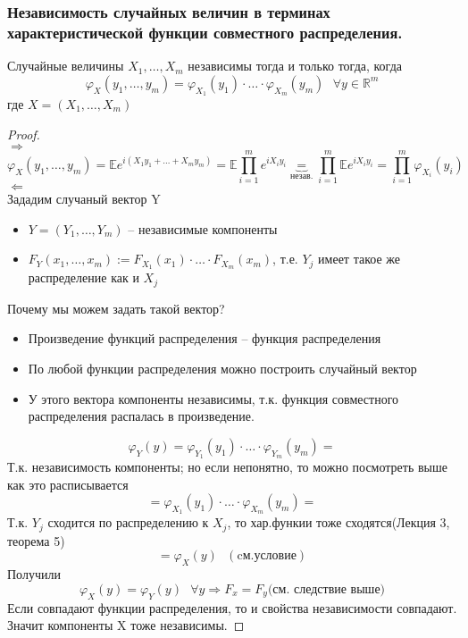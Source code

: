 	\subsubsection{Независимость случайных величин в терминах характеристической функции совместного распределения.}
	\begin{theorem}
		Случайные величины $ X_1,\ldots, X_m $ независимы тогда и только тогда, когда 
		$$\varphi_X(y_1,\ldots, y_m) = \varphi_{X_1}(y_1)\cdot\ldots\cdot\varphi_{X_m}(y_m)\text{ }\forall y\in\mathbb{R}^m$$
		где $X = (X_1, \ldots, X_m)$
	\end{theorem}
	\begin{proof}
		\text{ }\\
		$\Rightarrow$\\
		$$\varphi_X(y_1,\ldots,y_m) = \mathbb{E}e^{i(X_1y_1 + \ldots + X_my_m)} = \mathbb{E}\prod_{i = 1}^{m}e^{iX_iy_i} \underbrace{=}_{\text{незав.}} \prod_{i = 1}^m\mathbb{E}e^{iX_iy_i} = \prod_{i = 1}^m\varphi_{X_i}(y_i)$$
		$\Leftarrow$\\
		Зададим случаный вектор Y
		\begin{itemize}
			\item 
			$Y = (Y_1,\ldots, Y_m)$ -- независимые компоненты
			
			\item 
			$F_Y(x_1,\ldots, x_m):= F_{X_1}(x_1)\cdot\ldots\cdot F_{X_m}(x_m)$, т.е. $ Y_j $ имеет такое же распределение как и $ X_j $
		\end{itemize}
		Почему мы можем задать такой вектор?
		\begin{itemize}
			\item Произведение функций распределения -- функция распределения
			\item По любой функции распределения можно построить случайный вектор
			\item У этого вектора компоненты независимы, т.к. функция совместного распределения распалась в произведение. 
		\end{itemize}
		$$\varphi_Y(y) = \varphi_{Y_1}(y_1)\cdot\ldots\cdot\varphi_{Y_m}(y_m) = $$
		Т.к. независимость компоненты; но если непонятно, то можно посмотреть выше как это расписывается
		$$ = \varphi_{X_1}(y_1)\cdot\ldots\cdot\varphi_{X_m}(y_m) = $$
		Т.к. $ Y_j $ сходится по распределению к $ X_j $, то хар.функии тоже сходятся(Лекция 3, теорема 5)
		$$ = \varphi_X(y)\text{ }(\text{cм.условие})$$
		Получили
		$$\varphi_X(y) = \varphi_{Y}(y)\text{ }\forall y\Rightarrow F_x = F_y\text{(см. следствие выше)}$$
		Если совпадают функции распределения, то и свойства независимости совпадают. Значит компоненты X тоже независимы.
	\end{proof}
